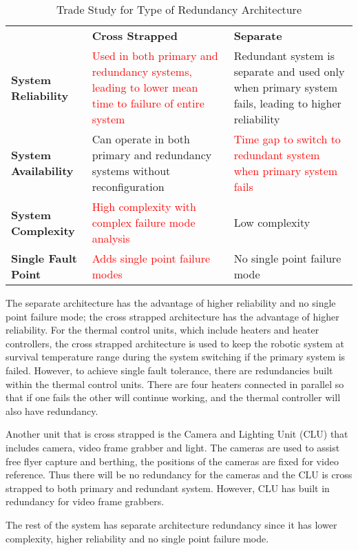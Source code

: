 \begin{table}[H]
\centering
\caption{Trade Study for Type of Redundancy Architecture}
\begin{tabular}{|P{3cm}|P{5.5cm}|P{5.5cm}|}
\hline
	&	\textbf{Cross Strapped}	&	\textbf{Separate}	\\\hhline{|=|=|=|}
\textbf{System Reliability}	&
\textcolor{red}{Used in both primary and redundancy systems, leading to lower mean time to failure of entire system \cite{AER407_electricalnotes}}	&
\textcolor{OliveGreen}{Redundant system is separate and used only when primary system fails, leading to higher reliability}	\\\hline
\textbf{System Availability}	&
\textcolor{OliveGreen}{Can operate in both primary and redundancy systems without reconfiguration \cite{ISS_robotcompare}}	&
\textcolor{red}{Time gap to switch to redundant system when primary system fails}	\\\hline
\textbf{System Complexity}	&
\textcolor{red}{High complexity with complex failure mode analysis \cite{spacecraftdesign}}	&
\textcolor{OliveGreen}{Low complexity}	\\\hline
\textbf{Single Fault Point}	&
\textcolor{red}{Adds single point failure modes \cite{AER407_electricalnotes}}	&
\textcolor{OliveGreen}{No single point failure mode}	\\\hline
\end{tabular}
\label{tab:redundancyto}
\end{table}
The separate architecture has the advantage of higher reliability and no single point failure mode; the cross strapped architecture has the advantage of higher reliability. For the thermal control units, which include heaters and heater controllers, the cross strapped architecture is used to keep the robotic system at survival temperature range during the system switching if the primary system is failed. However, to achieve single fault tolerance, there are redundancies built within the thermal control units. There are four heaters connected in parallel so that if one fails the other will continue working, and the thermal controller will also have redundancy.

Another unit that is cross strapped is the Camera and Lighting Unit (CLU) that includes camera, video frame grabber and light. The cameras are used to assist free flyer capture and berthing, the positions of the cameras are fixed for video reference. Thus there will be no redundancy for the cameras and the CLU is cross strapped to both primary and redundant system. However, CLU has built in redundancy for video frame grabbers.

The rest of the system has separate architecture redundancy since it has lower complexity, higher reliability and no single point failure mode. 

